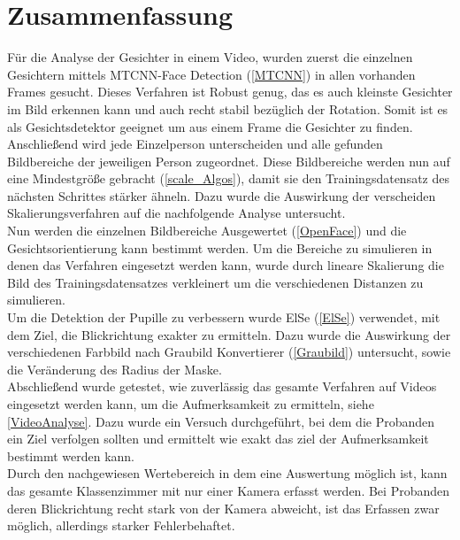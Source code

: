 \section{Zusammenfassung}
Für die Analyse der Gesichter in einem Video, wurden zuerst die einzelnen Gesichtern mittels MTCNN-Face Detection (\autoref{MTCNN}) in allen vorhanden Frames gesucht. Dieses Verfahren ist Robust genug, das es auch kleinste Gesichter im Bild erkennen kann und auch recht stabil bezüglich der Rotation. Somit ist es als Gesichtsdetektor geeignet um aus einem Frame die Gesichter zu finden.\\
Anschließend wird jede Einzelperson unterscheiden und alle gefunden Bildbereiche der jeweiligen Person zugeordnet. Diese Bildbereiche werden nun auf eine Mindestgröße gebracht (\autoref{scale_Algos}), damit sie den Trainingsdatensatz des nächsten Schrittes stärker ähneln. Dazu wurde die Auswirkung der verscheiden Skalierungsverfahren auf die nachfolgende Analyse untersucht.\\
Nun werden die einzelnen Bildbereiche Ausgewertet (\autoref{OpenFace}) und die Gesichtsorientierung kann bestimmt werden. Um die Bereiche zu simulieren in denen das Verfahren eingesetzt werden kann, wurde durch lineare Skalierung die Bild des Trainingsdatensatzes verkleinert um die verschiedenen Distanzen zu simulieren.\\
Um die Detektion der Pupille zu verbessern wurde ElSe (\autoref{ElSe}) verwendet, mit dem Ziel, die Blickrichtung exakter zu ermitteln. Dazu wurde die Auswirkung der verschiedenen Farbbild nach Graubild Konvertierer (\autoref{Graubild}) untersucht, sowie die Veränderung des Radius der Maske.\\
Abschließend wurde getestet, wie zuverlässig das gesamte Verfahren auf Videos eingesetzt werden kann, um die Aufmerksamkeit zu ermitteln, siehe \autoref{VideoAnalyse}. Dazu wurde ein Versuch durchgeführt, bei dem die Probanden ein Ziel verfolgen sollten und ermittelt wie exakt das ziel der Aufmerksamkeit bestimmt werden kann.\\
Durch den nachgewiesen Wertebereich in dem eine Auswertung möglich ist, kann das gesamte Klassenzimmer mit nur einer Kamera erfasst werden. Bei Probanden deren Blickrichtung recht stark von der Kamera abweicht, ist das Erfassen zwar möglich, allerdings starker Fehlerbehaftet.